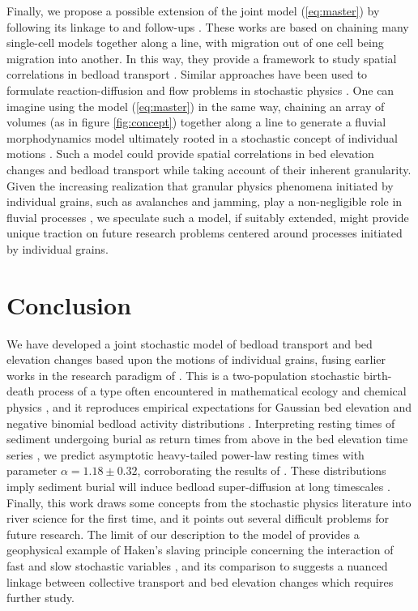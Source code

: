 \documentclass[draft]{agujournal2018}
\begin{document}
Finally, we propose a possible extension of the joint model (\ref{eq:master}) by following its linkage to \citet{Ancey2008} and follow-ups \citep[e.g.][]{Ancey2014a, Heyman2014, Heyman2015}.
These works are based on chaining many \citet{Ancey2008} single-cell models together along a line, with migration out of one cell being migration into another.
In this way, they provide a framework to study spatial correlations in bedload transport \citep[e.g.][]{Heyman2014,Heyman2015}.
Similar approaches have been used to formulate reaction-diffusion and flow problems in stochastic physics \citep[e.g.][]{Gardiner1983}. 
One can imagine using the model (\ref{eq:master}) in the same way, chaining an array of volumes (as in figure \ref{fig:concept}) together along a line to generate a fluvial morphodynamics model ultimately rooted in a stochastic concept of individual motions \citep[e.g.][]{Einstein1937}.
Such a model could provide spatial correlations in bed elevation changes and bedload transport while taking account of their inherent granularity.
Given the increasing realization that granular physics phenomena initiated by individual grains, such as avalanches and jamming, play a non-negligible role in fluvial processes \citep[e.g.][]{Saletti2016,Dhont2018}, we speculate such a model, if suitably extended, might provide unique traction on future research problems centered around processes initiated by individual grains.


\section{Conclusion}

We have developed a joint stochastic model of bedload transport and bed elevation changes based upon the motions of individual grains, fusing earlier works in the research paradigm of \citet{Einstein1937}.
This is a two-population stochastic birth-death process of a type often encountered in mathematical ecology \citep[e.g.][]{Pielou1977} and chemical physics \citep[e.g.][]{Gardiner1983}, and it reproduces empirical expectations for Gaussian bed elevation and negative binomial bedload activity distributions \citep[e.g.][]{Wong2007,Ancey2008}.
Interpreting resting times of sediment undergoing burial as return times from above in the bed elevation time series \citep[e.g.][]{Voepel2013}, we predict asymptotic heavy-tailed power-law resting times with parameter $\alpha = 1.18 \pm 0.32$, corroborating the results of \citet{Martin2014}.
These distributions imply sediment burial will induce bedload super-diffusion at long timescales \citep[e.g.][]{Phillips2013}.
Finally, this work draws some concepts from the stochastic physics literature into river science for the first time, and it points out several difficult problems for future research.
The limit of our description to the model of \citet{Martin2014} provides a geophysical example of Haken's slaving principle concerning the interaction of fast and slow stochastic variables \citep{Haken1983}, and its comparison to \citet{Ancey2008} suggests a nuanced linkage between collective transport and bed elevation changes which requires further study.
\end{document}
